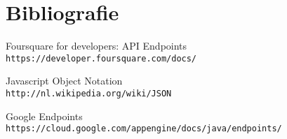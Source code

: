 \chapter{Bibliografie}

\begin{thebibliography}{9}
Foursquare for developers: API Endpoints
\\\texttt{https://developer.foursquare.com/docs/}

Javascript Object Notation
\\\texttt{http://nl.wikipedia.org/wiki/JSON}

Google Endpoints
\\\texttt{https://cloud.google.com/appengine/docs/java/endpoints/}

\end{thebibliography}





